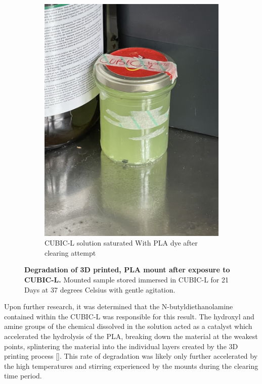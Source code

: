 \begin{figure}[H]
\begin{subfigure}[t]{0.4\textwidth}
    \includegraphics[width=1\linewidth]{Images/PLA_CUBIC_B.jpg}
    \caption{CUBIC-L solution saturated With PLA dye after clearing attempt}
    \end{subfigure}
    \medskip

\label{fig:enter-label}
\caption{\textbf{Degradation of 3D printed, PLA mount after exposure to CUBIC-L.} Mounted sample stored immersed in CUBIC-L for 21 Days at 37 degrees Celsius with gentle agitation.}
\end{figure}

Upon further research, it was determined that the N-butyldiethanolamine contained within the CUBIC-L was responsible for this result. The hydroxyl and amine groups of the chemical dissolved in the solution acted as a catalyst which accelerated the hydrolysis of the PLA, breaking down the material at the weakest points, splintering the material into the individual layers created by the 3D printing process []. This rate of degradation was likely only further accelerated by the high temperatures and stirring experienced by the mounts during the clearing time period. 

